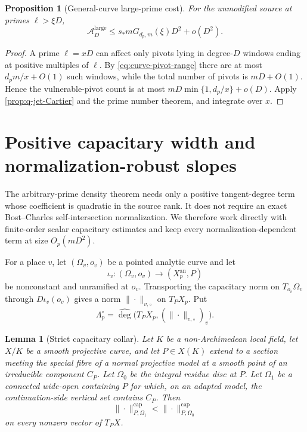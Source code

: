 \documentclass[11pt]{article}
\newtheorem{proposition}[proposition]{Proposition}
\newtheorem{lemma}[lemma]{Lemma}
\theoremstyle{definition}
\theoremstyle{remark}
\newcommand{\widehatdeg}{\widehat{\deg}}
\begin{document}
\begin{proposition}[General-curve large-prime cost]
\label{prop:curve-large}
For the unmodified source at primes $\ell>\xi D$,
\begin{equation}\label{eq:curve-large}
 \mathscr A_D^{\mathrm{large}}
 \le s_*mG_{d_p,m}(\xi)D^2+o(D^2).
\end{equation}
\end{proposition}

\begin{proof}
A prime $\ell=xD$ can affect only pivots lying in degree-$D$ windows ending
at positive multiples of $\ell$.  By \eqref{eq:curve-pivot-range} there are
at most $d_pm/x+O(1)$ such windows, while the total number of pivots is
$mD+O(1)$.  Hence the vulnerable-pivot count is at most
$mD\min\{1,d_p/x\}+o(D)$.  Apply \cref{prop:q-jet-Cartier} and the prime
number theorem, and integrate over $x$.
\end{proof}

\section{Positive capacitary width and normalization-robust slopes}
\label{sec:curve-bost}

The arbitrary-prime density theorem needs only a positive tangent-degree term
whose coefficient is quadratic in the source rank.  It does not require an
exact Bost--Charles self-intersection normalization.  We therefore work
directly with finite-order scalar capacitary estimates and keep every
normalization-dependent term at size $O_p(mD^2)$.

For a place $v$, let $(\Omega_v,o_v)$ be a pointed analytic curve and let
\[
 \iota_v:(\Omega_v,o_v)\longrightarrow (X_p^{\mathrm{an}},P)
\]
be nonconstant and unramified at $o_v$.  Transporting the capacitary norm on
$T_{o_v}\Omega_v$ through $D\iota_v(o_v)$ gives a norm
$\|\cdot\|_{v,\circ}$ on $T_PX_p$.  Put
\begin{equation}\label{eq:robust-width}
 \Lambda_p^\circ=
 \widehatdeg\bigl(T_PX_p,(\|\cdot\|_{v,\circ})_v\bigr).
\end{equation}

\begin{lemma}[Strict capacitary collar]
\label{lem:strict-cap-collar}
Let $K$ be a non-Archimedean local field, let $X/K$ be a smooth projective
curve, and let $P\in X(K)$ extend to a section meeting the special fibre of a
normal projective model at a smooth point of an irreducible component $C_P$.
Let $\Omega_0$ be the integral residue disc at $P$.  Let $\Omega_1$ be a
connected wide-open containing $P$ for which, on an adapted model, the
continuation-side vertical set contains $C_P$.  Then
\[
 \|\cdot\|^{\mathrm{cap}}_{P,\Omega_1}
 <\|\cdot\|^{\mathrm{cap}}_{P,\Omega_0}
\]
on every nonzero vector of $T_PX$.
\end{lemma}
\end{document}
